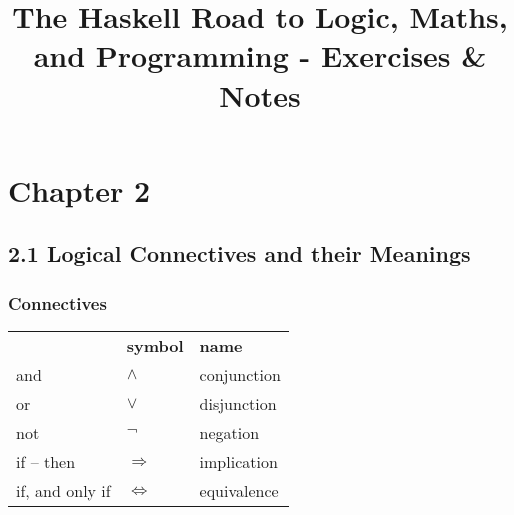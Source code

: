 \documentclass[11pt]{article}
\title{\textbf{The Haskell Road to Logic, Maths, and Programming - Exercises \& Notes}}
\author{}
\date{}
\begin{document}
\maketitle
\thispagestyle{empty}

\section*{Chapter 2}
\subsection*{2.1 Logical Connectives and their Meanings}
\subsubsection*{Connectives}

\begin{tabular}{lll}
     {} & \textbf{symbol} & \textbf{name}\\
	and & $\land$ & conjunction\\
	or & $\lor$ & disjunction\\
	not & $\neg$ & negation\\
	if -- then & $\Rightarrow$ & implication\\
	if, and only if & $\iff$ & equivalence\\
\end{tabular}
\end{document}
